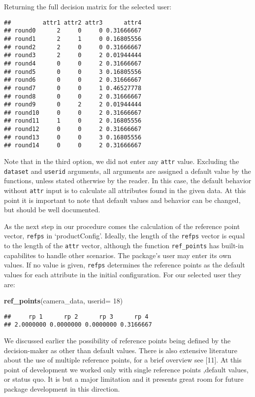 \documentclass[]{article}
\newenvironment{Shaded}{\begin{snugshade}}{\end{snugshade}}
\newcommand{\KeywordTok}[1]{\textcolor[rgb]{0.13,0.29,0.53}{\textbf{{#1}}}}
\newcommand{\DataTypeTok}[1]{\textcolor[rgb]{0.13,0.29,0.53}{{#1}}}
\newcommand{\DecValTok}[1]{\textcolor[rgb]{0.00,0.00,0.81}{{#1}}}
\newcommand{\NormalTok}[1]{{#1}}
\begin{document}
Returning the full decision matrix for the selected user:

\begin{verbatim}
##         attr1 attr2 attr3      attr4
## round0      2     0     0 0.31666667
## round1      2     1     0 0.16805556
## round2      2     0     0 0.31666667
## round3      2     0     2 0.01944444
## round4      0     0     2 0.31666667
## round5      0     0     3 0.16805556
## round6      0     0     2 0.31666667
## round7      0     0     1 0.46527778
## round8      0     0     2 0.31666667
## round9      0     2     2 0.01944444
## round10     0     0     2 0.31666667
## round11     1     0     2 0.16805556
## round12     0     0     2 0.31666667
## round13     0     0     3 0.16805556
## round14     0     0     2 0.31666667
\end{verbatim}

Note that in the third option, we did not enter any \texttt{attr} value.
Excluding the \texttt{dataset} and \texttt{userid} arguments, all
arguments are assigned a default value by the functions, unless stated
otherwise by the reader. In this case, the default behavior without
\texttt{attr} input is to calculate all attributes found in the given
data. At this point it is important to note that default values and
behavior can be changed, but should be well documented.

As the next step in our procedure comes the calculation of the reference
point vector, \texttt{refps} in `productConfig'. Ideally, the length of
the \texttt{refps} vector is equal to the length of the \texttt{attr}
vector, although the function \texttt{ref\_points} has built-in
capabilites to handle other scenarios. The package's user may enter its
own values. If no value is given, \texttt{refps} determines the
reference points as the default values for each attribute in the initial
configuration. For our selected user they are:

\begin{Shaded}
\begin{Highlighting}[]
\KeywordTok{ref_points}\NormalTok{(camera_data, }\DataTypeTok{userid=} \DecValTok{18}\NormalTok{) }
\end{Highlighting}
\end{Shaded}

\begin{verbatim}
##     rp 1      rp 2      rp 3      rp 4  
## 2.0000000 0.0000000 0.0000000 0.3166667
\end{verbatim}

We discussed earlier the possibility of reference points being defined
by the decision-maker as other than default values. There is also
extensive literature about the use of multiple reference points, for a
brief overview see {[}11{]}. At this point of development we worked only
with single reference points ,default values, or status quo. It is but a
major limitation and it presents great room for future package
development in this direction.
\end{document}
